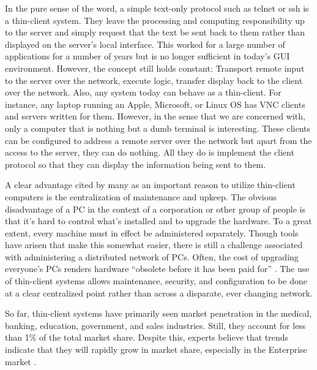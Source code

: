 In the pure sense of the word, a simple text-only protocol such as telnet or ssh
is a thin-client system.  They leave the processing and computing responsibility
up to the server and simply request that the text be sent back to them rather
than displayed on the server's local interface.  This worked for a large number
of applications for a number of years but is no longer sufficient in today's GUI
environment.  However, the concept still holds constant: Transport remote input
to the server over the network, execute logic, transfer display back to the
client over the network.  Also, any system today can behave as a thin-client.
For instance, any laptop running an Apple, Microsoft, or Linux OS has VNC
clients and servers written for them.  However, in the sense that we are
concerned with, only a computer that is nothing but a dumb terminal is
interesting.  These clients can be configured to address a remote server over
the network but apart from the access to the server, they can do nothing.  All
they do is implement the client protocol so that they can display the
information being sent to them.

A clear advantage cited by many as an important reason to utilize thin-client
computers is the centralization of maintenance and upkeep.  The obvious
disadvantage of a PC in the context of a corporation or other group of people is
that it's hard to control what's installed and to upgrade the hardware.  To a
great extent, every machine must in effect be administered separately.  Though
tools have arisen that make this somewhat easier, there is still a challenge
associated with administering a distributed network of PCs.  Often, the cost of
upgrading everyone's PCs renders hardware ``obsolete before it has been paid
for'' \citep{schmidt1999}.  The use of thin-client systems allows maintenance,
security, and configuration to be done at a clear centralized point rather than
across a disparate, ever changing network.

So far, thin-client systems have primarily seen market penetration in the
medical, banking, education, government, and sales industries. Still, they
account for less than 1\% of the total market share.  Despite this, experts
believe that trends indicate that they will rapidly grow in market share,
especially in the Enterprise market \citep{tynan2005}.

